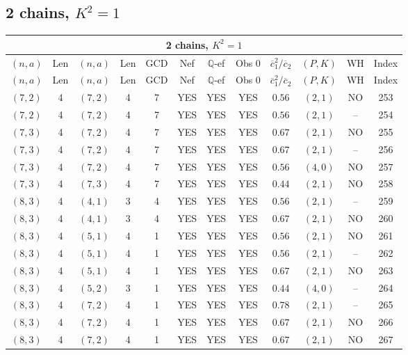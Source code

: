 \subsection{2 chains, $K^2 = 1$}
\begin{longtable}{|c|c|c|c|c|c|c|c|c|c|c|c|}
\hline
\multicolumn{12}{|c|}{2 chains, $K^2 = 1$}\\
\hline
$(n,a)$ & Len & $(n,a)$ & Len & GCD & Nef & $\mathbb Q$-ef & Obs 0 & $\overline c_1^2 / \overline c_2$ & $(P,K)$ & WH & Index\\
\hline
\endfirsthead

\hline
$(n,a)$ & Len & $(n,a)$ & Len & GCD & Nef & $\mathbb Q$-ef & Obs 0 & $\overline c_1^2 / \overline c_2$ & $(P,K)$ & WH & Index\\
\hline
\endhead
\hline
\endfoot

$(7,2)$ & 4 & $(7,2)$ & 4 & 7 & YES & YES & YES & $0.56$ & $(2,1)$ & NO & 253\\
$(7,2)$ & 4 & $(7,2)$ & 4 & 7 & YES & YES & YES & $0.56$ & $(2,1)$ & -- & 254\\
$(7,3)$ & 4 & $(7,2)$ & 4 & 7 & YES & YES & YES & $0.67$ & $(2,1)$ & NO & 255\\
$(7,3)$ & 4 & $(7,2)$ & 4 & 7 & YES & YES & YES & $0.67$ & $(2,1)$ & -- & 256\\
$(7,3)$ & 4 & $(7,2)$ & 4 & 7 & YES & YES & YES & $0.56$ & $(4,0)$ & NO & 257\\
$(7,3)$ & 4 & $(7,3)$ & 4 & 7 & YES & YES & YES & $0.44$ & $(2,1)$ & NO & 258\\
$(8,3)$ & 4 & $(4,1)$ & 3 & 4 & YES & YES & YES & $0.56$ & $(2,1)$ & -- & 259\\
$(8,3)$ & 4 & $(4,1)$ & 3 & 4 & YES & YES & YES & $0.67$ & $(2,1)$ & NO & 260\\
$(8,3)$ & 4 & $(5,1)$ & 4 & 1 & YES & YES & YES & $0.56$ & $(2,1)$ & NO & 261\\
$(8,3)$ & 4 & $(5,1)$ & 4 & 1 & YES & YES & YES & $0.56$ & $(2,1)$ & -- & 262\\
$(8,3)$ & 4 & $(5,1)$ & 4 & 1 & YES & YES & YES & $0.67$ & $(2,1)$ & NO & 263\\
$(8,3)$ & 4 & $(5,2)$ & 3 & 1 & YES & YES & YES & $0.44$ & $(4,0)$ & -- & 264\\
$(8,3)$ & 4 & $(7,2)$ & 4 & 1 & YES & YES & YES & $0.78$ & $(2,1)$ & -- & 265\\
$(8,3)$ & 4 & $(7,2)$ & 4 & 1 & YES & YES & YES & $0.67$ & $(2,1)$ & NO & 266\\
$(8,3)$ & 4 & $(7,2)$ & 4 & 1 & YES & YES & YES & $0.67$ & $(2,1)$ & NO & 267\\

\end{longtable}
